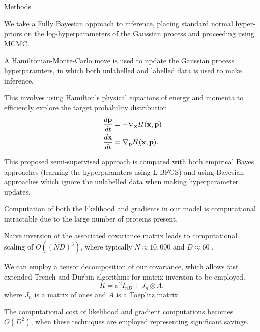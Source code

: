 \documentclass[final, 10pt]{beamer}
\newlength{\onecolwid}
\newlength{\twocolwid}
\begin{document}
\begin{frame}[t]
\begin{columns}[t]
\begin{column}{\twocolwid}
\begin{columns}[t,totalwidth=\twocolwid]
\begin{column}{\onecolwid}
\begin{block}{Methods}
        \begin{itemize}
        \small{\item We take a Fully Bayesian approach to inference, placing standard normal hyper-priors on the log-hyperparameters of the Gaussian process and proceeding using MCMC.
        \item A Hamiltonian-Monte-Carlo move is used to update the Gaussian process hyperparamters, in which both unlabelled and labelled data is used to make inference.
        \item This involves using Hamilton's physical equations of energy and momenta to efficiently explore the target probability distribution
        \begin{equation}
        \begin{split}
        \frac{d\bf{p}}{dt}& = -\nabla_{\bf{x}} H(\bf{x},\bf{p})\\
        \frac{d\bf{x}}{dt}& = \nabla_{\bf{p}} H(\bf{x},\bf{p}).
        \end{split}
        \end{equation}
    	\item This proposed semi-supervised approach is compared with both empirical Bayes approaches (learning the hyperparamters using L-BFGS) and using Bayesian approaches which ignore the unlabelled data when making hyperparameter updates.
    	\item Computation of both the likelihood and gradients in our model is computational intractable due to the large number of proteins present.
    	\item Na\"ive inversion of the associated covariance matrix leads to computational scaling of $O((ND)^{3})$, where typically $N \approx 10,000$ and $D \approx 60$ .
    	\item We can employ a tensor decomposition of our covariance, which allows fast extended Trench and Durbin algorithms for matrix inversion to be employed.
	    \begin{equation}
	    K = \sigma^2I_{nD} + J_{n} \otimes A,
	    \end{equation}
	    where $J_n$ is a matrix of ones and $A$ is a Toeplitz matrix.
	    \item The computational cost of likelihood and gradient computations becomes $O(D^2)$, when these techniques are employed representing significant savings.
	}
        \end{itemize}




      \end{block}


\end{column}
\end{columns}
\end{column}
\end{columns}
\end{frame}
\end{document}
